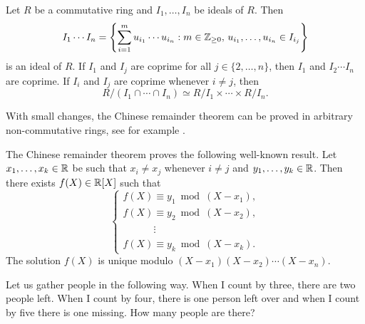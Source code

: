 Let $R$ be a commutative ring and $I_1,\dots,I_n$ be ideals of $R$. Then
\[
I_1\cdots I_n=\left\{
	\sum_{i=1}^mu_{i_1}\cdots u_{i_n}:m\in\mathbb{Z}_{\geq0},\,u_{i_1},\dots,u_{i_n}\in I_{i_j}
\right\}
\]
is an ideal of $R$. If $I_1$ and $I_j$ are coprime for all $j\in\{2,\dots,n\}$, 
then $I_1$ and $I_2\cdots I_n$ are coprime. If $I_i$ and $I_j$ are coprime
whenever $i\ne j$, then 
\[
R/(I_1\cap\cdots\cap I_n)\simeq R/I_1\times\cdots\times R/I_n.
\]

With small changes, the Chinese remainder theorem can be proved 
in arbitrary non-commutative rings, see for example 
\cite[Chapter III, Theorem 2.25]{MR600654}. 

\begin{bonus}
	The Chinese remainder theorem proves the following well-known result. 
	Let $x_1,\dots,x_k\in\mathbb{R}$ be such that $x_i\ne x_j$ whenever $i\ne j$ 
	and $y_1,\dots,y_k\in\mathbb{R}$. Then there exists $f(X)\in\mathbb{R}[X]$ such that
	\[
	\begin{cases}
		f(X)\equiv y_1\bmod (X-x_1),\\
		f(X)\equiv y_2\bmod (X-x_2),\\
		\phantom{f(X)}\vdots\\
		f(X)\equiv y_k\bmod (X-x_k).  	
	\end{cases}
 	\]
 	The solution $f(X)$ is unique modulo $(X-x_1)(X-x_2)\cdots (X-x_n)$. 
\end{bonus}

%


\begin{bonus}
\label{xca:gather_people}
	Let us gather people in the following way. When I 
	count by three, there are two people left. 	When I count by four, 
	there is one person left over and when I count by five there is
	one missing. How many people are there?
\end{bonus}

